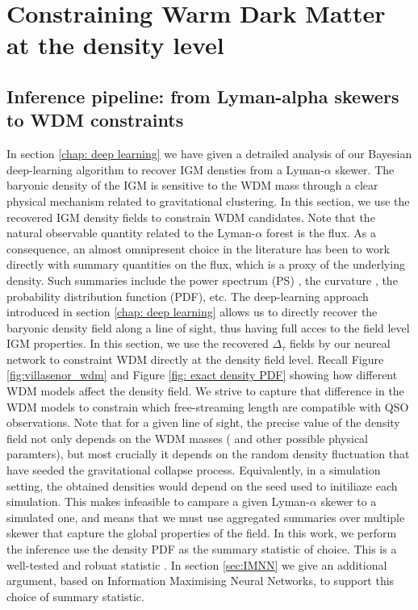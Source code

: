 \chapter{Constraining Warm Dark Matter at the density level}\label{sec: inference pipeline}


\section{Inference pipeline: from Lyman-alpha skewers to WDM constraints}

In section \ref{chap: deep learning} we have given a detrailed analysis of our Bayesian deep-learning algorithm to recover IGM densties from a Lyman-$\alpha$ skewer. The baryonic density of the IGM is sensitive to the WDM mass through a clear physical mechanism related to gravitational clustering. In this section, we use the recovered IGM density fields to constrain WDM candidates. Note that the natural observable quantity related to the Lyman-$\alpha$ forest is the flux. As a consequence, an almost omnipresent choice in the literature has been to work directly with summary quantities on the flux, which is a proxy of the underlying density. Such summaries include the power spectrum (PS) \cite{Villasenor_2023}, the curvature \cite{Becker_2010}, the probability distribution function (PDF), etc. The deep-learning approach introduced in section \ref{chap: deep learning} allows us to directly recover the baryonic density field along a line of sight, thus having full acces to the field level IGM properties. In this section, we use the recovered $\Delta_\tau$ fields by our neureal network to constraint WDM directly at the density field level. Recall Figure \ref{fig:villasenor_wdm} and Figure \ref{fig: exact density PDF} showing how different WDM models affect the density field. We strive to capture that difference in the WDM models to constrain which free-streaming length are compatible with QSO observations. Note that for a given line of sight, the precise value of the density field not only depends on the WDM masses ( and other possible physical paramters), but most crucially it depends on the random density fluctuation that have seeded the gravitational collapse process. Equivalently, in a simulation setting, the obtained densities would depend on the seed used to initiliaze each simulation. This makes infeasible to campare a given Lyman-$\alpha$ skewer to a simulated one, and means that we must use aggregated summaries over multiple skewer that capture the global properties of the field. In this work, we perform the inference use the density PDF as the summary statistic of choice. This is a well-tested and robuat statistic \cite{Gaikwad_2021}. In section \ref{sec:IMNN} we give an additional argument, based on Information Maximising Neural Networks, to support this choice of summary statistic.


